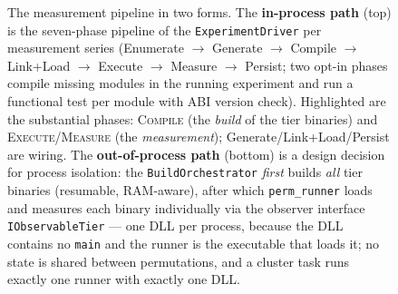 \begin{nurkurz}
\begin{figure}[htbp]
\caption{The measurement pipeline in two forms. The \textbf{in-process path} (top) is the seven-phase
pipeline of the \texttt{ExperimentDriver} per measurement series (Enumerate $\to$ Generate $\to$ Compile
$\to$ Link+Load $\to$ Execute $\to$ Measure $\to$ Persist; two opt-in phases compile missing modules in
the running experiment and run a functional test per module with ABI version check). Highlighted are the
substantial phases: \textsc{Compile} (the \emph{build} of the tier binaries) and
\textsc{Execute}/\textsc{Measure} (the \emph{measurement}); Generate/Link+Load/Persist are wiring. The
\textbf{out-of-process path} (bottom) is a design decision for process isolation: the
\texttt{BuildOrchestrator} \emph{first} builds \emph{all} tier binaries (resumable, RAM-aware), after
which \texttt{perm\_runner} loads and measures each binary individually via the observer interface
\texttt{IObservableTier} --- one DLL per process, because the DLL contains no \texttt{main} and the
runner is the executable that loads it; no state is shared between permutations, and a cluster task
runs exactly one runner with exactly one DLL.}\label{fig:pipeline}
\end{figure}


\end{nurkurz}
